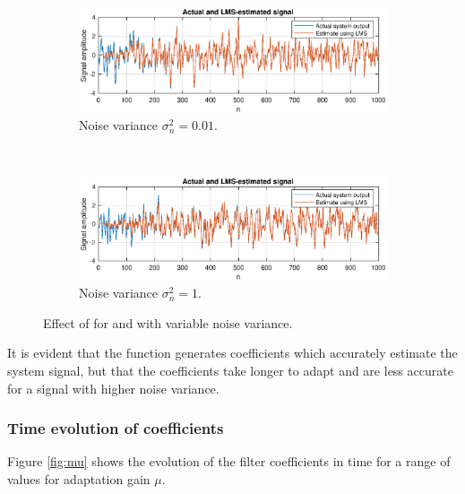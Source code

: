 \begin{figure}[H]
\centering
\begin{subfigure}{.4\textwidth}
  \centering
  \includegraphics[width=\linewidth]{assignment4figs/actual_lms_noise01.eps}  
  \caption{Noise variance $\sigma_{n}^{2} = 0.01$.}
\end{subfigure}\\
\begin{subfigure}{.4\textwidth}
  \centering
  \includegraphics[width=\linewidth]{assignment4figs/actual_lms_noise1.eps}  
  \caption{Noise variance $\sigma_{n}^{2} = 1$.}
\end{subfigure}
\caption{Effect of  for  and  with variable noise variance.}
\label{fig:lmsdemo}
\end{figure}

\noindent
It is evident that the function generates coefficients which accurately estimate the system signal, but that the coefficients take longer to adapt and are less accurate for a signal with higher noise variance.

\subsubsection{Time evolution of coefficients}

Figure \ref{fig:mu} shows the evolution of the filter coefficients in time for a range of values for adaptation gain $\mu$.

